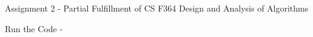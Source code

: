 Assignment 2 -\/ Partial Fulfillment of CS F364 Design and Analysis of Algorithms

Run the Code -\/ 
\begin{DoxyCode}{0}

\end{DoxyCode}
 